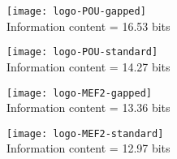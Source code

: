 \texttt{[image: logo-POU-gapped]} \\
Information content = 16.53 bits


\texttt{[image: logo-POU-standard]} \\
Information content = 14.27 bits


\texttt{[image: logo-MEF2-gapped]} \\
Information content = 13.36 bits


\texttt{[image: logo-MEF2-standard]} \\
Information content = 12.97 bits


